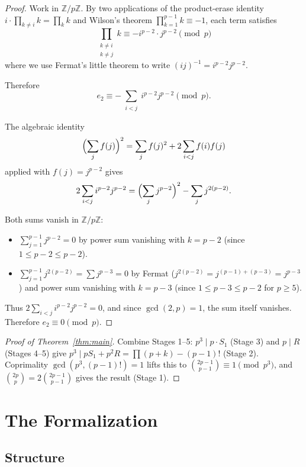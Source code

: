 \documentclass[11pt]{article}
\theoremstyle{definition}
\theoremstyle{remark}
\begin{document}
\begin{proof}
Work in $\mathbb{Z}/p\mathbb{Z}$. By two applications of the product-erase identity $i \cdot \prod_{k \neq i} k = \prod_k k$ and Wilson's theorem $\prod_{k=1}^{p-1} k \equiv -1$, each term satisfies
\[
\prod_{\substack{k \neq i \\ k \neq j}} k \equiv -i^{p-2} \cdot j^{p-2} \pmod{p}
\]
where we use Fermat's little theorem to write $(ij)^{-1} = i^{p-2} j^{p-2}$.

Therefore
\[
e_2 \equiv -\sum_{\substack{i < j}} i^{p-2} j^{p-2} \pmod{p}.
\]

The algebraic identity
\[
\Bigl(\sum_{j} f(j)\Bigr)^2 = \sum_j f(j)^2 + 2 \sum_{i < j} f(i) f(j)
\]
applied with $f(j) = j^{p-2}$ gives
\[
2 \sum_{i < j} i^{p-2} j^{p-2} = \Bigl(\sum_j j^{p-2}\Bigr)^2 - \sum_j j^{2(p-2)}.
\]

Both sums vanish in $\mathbb{Z}/p\mathbb{Z}$:
\begin{itemize}
\item $\sum_{j=1}^{p-1} j^{p-2} = 0$ by power sum vanishing with $k = p-2$ (since $1 \leq p-2 \leq p-2$).
\item $\sum_{j=1}^{p-1} j^{2(p-2)} = \sum j^{p-3} = 0$ by Fermat ($j^{2(p-2)} = j^{(p-1)+(p-3)} = j^{p-3}$) and power sum vanishing with $k = p-3$ (since $1 \leq p-3 \leq p-2$ for $p \geq 5$).
\end{itemize}

Thus $2 \sum_{i<j} i^{p-2} j^{p-2} = 0$, and since $\gcd(2, p) = 1$, the sum itself vanishes. Therefore $e_2 \equiv 0 \pmod{p}$.
\end{proof}

\begin{proof}[Proof of Theorem~\ref{thm:main}]
Combine Stages 1--5: $p^3 \mid p \cdot S_1$ (Stage 3) and $p \mid R$ (Stages 4--5) give $p^3 \mid p S_1 + p^2 R = \prod(p+k) - (p-1)!$ (Stage 2). Coprimality $\gcd(p^3, (p-1)!) = 1$ lifts this to $\binom{2p-1}{p-1} \equiv 1 \pmod{p^3}$, and $\binom{2p}{p} = 2\binom{2p-1}{p-1}$ gives the result (Stage 1).
\end{proof}

\section{The Formalization}

\subsection{Structure}
\end{document}
